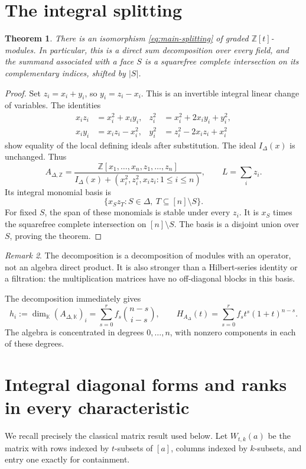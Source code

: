 \documentclass[11pt]{article}
\newtheorem{theorem}{Theorem}[section]
\theoremstyle{remark}
\newtheorem{remark}[theorem]{Remark}
\newcommand{\kk}{\mathbb K}
\newcommand{\ZZ}{\mathbb Z}
\begin{document}
\section{The integral splitting}
\begin{theorem}\label{thm:splitting}
There is an isomorphism \eqref{eq:main-splitting} of graded $\ZZ[t]$-modules. In particular, this is a direct sum decomposition over every field, and the summand associated with a face $S$ is a squarefree complete intersection on its complementary indices, shifted by $|S|$.
\end{theorem}
\begin{proof}
Set $z_i=x_i+y_i$, so $y_i=z_i-x_i$. This is an invertible integral linear change of variables. The identities
\begin{align*}
 x_i z_i&=x_i^2+x_i y_i,&
 z_i^2&=x_i^2+2x_i y_i+y_i^2,\\
 x_i y_i&=x_i z_i-x_i^2,&
 y_i^2&=z_i^2-2x_i z_i+x_i^2
\end{align*}
show equality of the local defining ideals after substitution. The ideal $I_\Delta(x)$ is unchanged. Thus
\[
 A_{\Delta,\ZZ}=
 \frac{\ZZ[x_1,\ldots,x_n,z_1,\ldots,z_n]}
 {I_\Delta(x)+(x_i^2,z_i^2,x_i z_i:1\leq i\leq n)},
 \qquad L=\sum_i z_i.
\]
Its integral monomial basis is
\[
 \{x_S z_T:S\in\Delta,\ T\subseteq[n]\setminus S\}.
\]
For fixed $S$, the span of these monomials is stable under every $z_i$. It is $x_S$ times the squarefree complete intersection on $[n]\setminus S$. The basis is a disjoint union over $S$, proving the theorem.
\end{proof}

\begin{remark}
The decomposition is a decomposition of modules with an operator, not an algebra direct product. It is also stronger than a Hilbert-series identity or a filtration: the multiplication matrices have no off-diagonal blocks in this basis.
\end{remark}

The decomposition immediately gives
\begin{equation}\label{eq:hilbert}
 h_i:=\dim_\kk(A_{\Delta,\kk})_i
 =\sum_{s=0}^r f_s\binom{n-s}{i-s},\qquad
 H_{A_\Delta}(t)=\sum_{s=0}^r f_s t^s(1+t)^{n-s}.
\end{equation}
The algebra is concentrated in degrees $0,\ldots,n$, with nonzero components in each of these degrees.

\section{Integral diagonal forms and ranks in every characteristic}
We recall precisely the classical matrix result used below. Let $W_{t,k}(a)$ be the matrix with rows indexed by $t$-subsets of $[a]$, columns indexed by $k$-subsets, and entry one exactly for containment.
\end{document}
